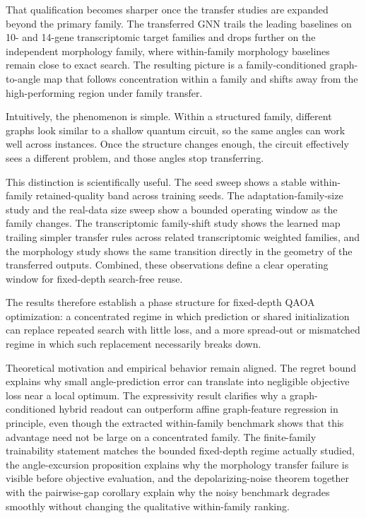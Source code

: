 \documentclass[
  reprint,
  twocolumn,
  aps,
  superscriptaddress,
  longbibliography,
  floatfix
]{revtex4-2}
\begin{document}
That qualification becomes sharper once the transfer studies are expanded beyond the primary family. The transferred GNN trails the leading baselines on 10- and 14-gene transcriptomic target families and drops further on the independent morphology family, where within-family morphology baselines remain close to exact search. The resulting picture is a family-conditioned graph-to-angle map that follows concentration within a family and shifts away from the high-performing region under family transfer.

Intuitively, the phenomenon is simple. Within a structured family, different graphs look similar to a shallow quantum circuit, so the same angles can work well across instances. Once the structure changes enough, the circuit effectively sees a different problem, and those angles stop transferring.

This distinction is scientifically useful. The seed sweep shows a stable within-family retained-quality band across training seeds. The adaptation-family-size study and the real-data size sweep show a bounded operating window as the family changes. The transcriptomic family-shift study shows the learned map trailing simpler transfer rules across related transcriptomic weighted families, and the morphology study shows the same transition directly in the geometry of the transferred outputs. Combined, these observations define a clear operating window for fixed-depth search-free reuse.

The results therefore establish a phase structure for fixed-depth QAOA optimization: a concentrated regime in which prediction or shared initialization can replace repeated search with little loss, and a more spread-out or mismatched regime in which such replacement necessarily breaks down.

Theoretical motivation and empirical behavior remain aligned. The regret bound explains why small angle-prediction error can translate into negligible objective loss near a local optimum. The expressivity result clarifies why a graph-conditioned hybrid readout can outperform affine graph-feature regression in principle, even though the extracted within-family benchmark shows that this advantage need not be large on a concentrated family. The finite-family trainability statement matches the bounded fixed-depth regime actually studied, the angle-excursion proposition explains why the morphology transfer failure is visible before objective evaluation, and the depolarizing-noise theorem together with the pairwise-gap corollary explain why the noisy benchmark degrades smoothly without changing the qualitative within-family ranking.
\end{document}
